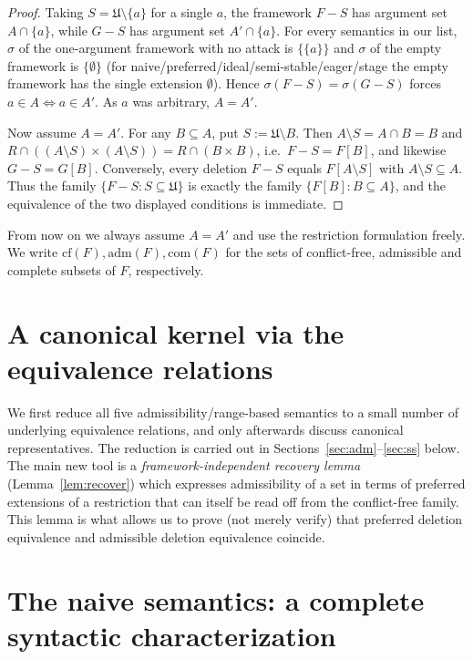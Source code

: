 \documentclass{amsart}
\theoremstyle{remark}
\begin{document}
\begin{proof}
Taking $S=\mathfrak U\setminus\{a\}$ for a single $a$, the framework $F-S$ has
argument set $A\cap\{a\}$, while $G-S$ has argument set $A'\cap\{a\}$.  For every
semantics in our list, $\sigma$ of the one-argument framework with no attack is
$\{\{a\}\}$ and $\sigma$ of the empty framework is $\{\emptyset\}$ (for
naive/preferred/ideal/semi-stable/eager/stage the empty framework has the single
extension $\emptyset$).  Hence $\sigma(F-S)=\sigma(G-S)$ forces
$a\in A\iff a\in A'$.  As $a$ was arbitrary, $A=A'$.

Now assume $A=A'$.  For any $B\subseteq A$, put $S:=\mathfrak U\setminus B$.  Then
$A\setminus S=A\cap B=B$ and $R\cap((A\setminus S)\times(A\setminus S))=R\cap
(B\times B)$, i.e.\ $F-S=F[B]$, and likewise $G-S=G[B]$.  Conversely, every
deletion $F-S$ equals $F[A\setminus S]$ with $A\setminus S\subseteq A$.  Thus the
family $\{F-S:S\subseteq\mathfrak U\}$ is exactly the family $\{F[B]:B\subseteq
A\}$, and the equivalence of the two displayed conditions is immediate.
\end{proof}

From now on we always assume $A=A'$ and use the restriction formulation freely.
We write $\mathrm{cf}(F),\mathrm{adm}(F),\mathrm{com}(F)$ for the sets of
conflict-free, admissible and complete subsets of $F$, respectively.

\section{A canonical kernel via the equivalence relations}

We first reduce all five admissibility/range-based semantics to a small number of
underlying equivalence relations, and only afterwards discuss canonical
representatives.  The reduction is carried out in
Sections~\ref{sec:adm}--\ref{sec:ss} below.  The main new tool is a
\emph{framework-independent recovery lemma} (Lemma~\ref{lem:recover}) which
expresses admissibility of a set in terms of preferred extensions of a
restriction that can itself be read off from the conflict-free family.  This
lemma is what allows us to prove (not merely verify) that preferred deletion
equivalence and admissible deletion equivalence coincide.

\section{The naive semantics: a complete syntactic characterization}
\end{document}

